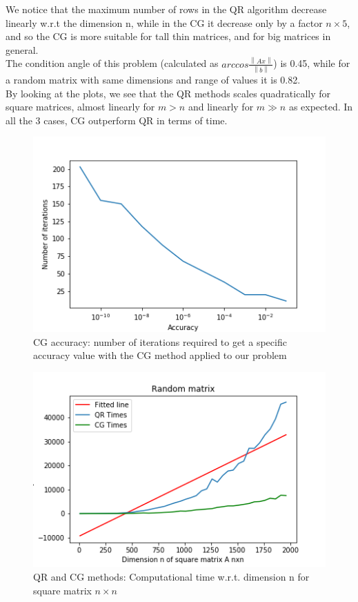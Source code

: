 \documentclass{article}
\begin{document}
We notice that the maximum number of rows in the QR algorithm decrease linearly w.r.t the dimension n, while in the CG it decrease only by a factor $n \times 5$, and so the CG is more suitable for tall thin matrices, and for big matrices in general.
\\The condition angle of this problem (calculated as $arccos\frac{\left\lVert A x \right\rVert}{\left\lVert b \right\rVert}$) is 0.45, while for a random matrix with same dimensions and range of values it is 0.82.
\\By looking at the plots, we see that the QR methods scales quadratically for square matrices, almost linearly for $m>n$ and linearly for $m\gg n$ as expected.
In all the 3 cases, CG outperform QR in terms of time.
         \begin{figure}
            \includegraphics[width=\linewidth]{../results/cg_accuracy.png}
            \caption{CG accuracy: number of iterations required to get a specific accuracy value with the CG method applied to our problem}
        \end{figure}
        \begin{figure}
            \includegraphics[width=\linewidth]{../results/square.png}
            \caption{QR and CG methods: Computational time w.r.t. dimension n for square matrix $n \times n$}
        \end{figure}
\end{document}
